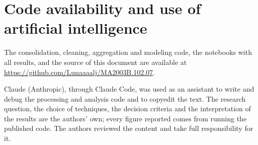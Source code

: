 \section*{Code availability and use of artificial intelligence}
\label{sec:disponibilidad-ia}

The consolidation, cleaning, aggregation and modeling code, the notebooks with
all results, and the source of this document are available at
\url{https://github.com/Lunaaaalj/MA2003B.102.07}.

Claude (Anthropic), through Claude Code, was used as an assistant to write and
debug the processing and analysis code and to copyedit the text. The research
question, the choice of techniques, the decision criteria and the
interpretation of the results are the authors' own; every figure reported
comes from running the published code. The authors reviewed the content and
take full responsibility for it.
